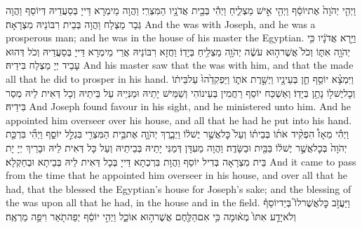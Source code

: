 {וַיְהִ֤י יְהֹוָה֙ אֶת\maqqaf יוֹסֵ֔ף וַיְהִ֖י אִ֣ישׁ מַצְלִ֑יחַ וַיְהִ֕י בְּבֵ֖ית אֲדֹנָ֥יו הַמִּצְרִֽי׃}
{וַהֲוָה מֵימְרָא דַּייָ בְּסַעֲדֵיהּ דְּיוֹסֵף וַהֲוָה גְּבַר מַצְלַח וַהֲוָה בְּבֵית רִבּוֹנֵיהּ מִצְרָאָה׃}
{And the \lord\space was with Joseph, and he was a prosperous man; and he was in the house of his master the Egyptian.}{}
{וַיַּ֣רְא אֲדֹנָ֔יו כִּ֥י יְהֹוָ֖ה אִתּ֑וֹ וְכֹל֙ אֲשֶׁר\maqqaf ה֣וּא עֹשֶׂ֔ה יְהֹוָ֖ה מַצְלִ֥יחַ בְּיָדֽוֹ׃}
{וַחֲזָא רִבּוֹנֵיהּ אֲרֵי מֵימְרָא דַּייָ בְּסַעֲדֵיהּ וְכֹל דְּהוּא עָבֵיד יְיָ מַצְלַח בִּידֵיהּ׃}
{And his master saw that the \lord\space was with him, and that the \lord\space made all that he did to prosper in his hand.}{}
{וַיִּמְצָ֨א יוֹסֵ֥ף חֵ֛ן בְּעֵינָ֖יו וַיְשָׁ֣רֶת אֹת֑וֹ וַיַּפְקִדֵ֙הוּ֙ עַל\maqqaf בֵּית֔וֹ וְכׇל\maqqaf יֶשׁ\maqqaf ל֖וֹ נָתַ֥ן בְּיָדֽוֹ׃}
{וְאַשְׁכַּח יוֹסֵף רַחֲמִין בְּעֵינוֹהִי וְשַׁמֵּישׁ יָתֵיהּ וּמַנְּיֵיהּ עַל בֵּיתֵיהּ וְכָל דְּאִית לֵיהּ מְסַר בִּידֵיהּ׃}
{And Joseph found favour in his sight, and he ministered unto him. And he appointed him overseer over his house, and all that he had he put into his hand.}{}
{וַיְהִ֡י מֵאָז֩ הִפְקִ֨יד אֹת֜וֹ בְּבֵית֗וֹ וְעַל֙ כׇּל\maqqaf אֲשֶׁ֣ר יֶשׁ\maqqaf ל֔וֹ וַיְבָ֧רֶךְ יְהֹוָ֛ה אֶת\maqqaf בֵּ֥ית הַמִּצְרִ֖י בִּגְלַ֣ל יוֹסֵ֑ף וַיְהִ֞י בִּרְכַּ֤ת יְהֹוָה֙ בְּכׇל\maqqaf אֲשֶׁ֣ר יֶשׁ\maqqaf ל֔וֹ בַּבַּ֖יִת וּבַשָּׂדֶֽה׃}
{וַהֲוָה מֵעִדָּן דְּמַנִּי יָתֵיהּ בְּבֵיתֵיהּ וְעַל כָּל דְּאִית לֵיהּ וּבָרֵיךְ יְיָ יָת בֵּית מִצְרָאָה בְּדִיל יוֹסֵף וַהֲוָת בִּרְכְתָא דַּייָ בְּכָל דְּאִית לֵיהּ בְּבֵיתָא וּבְחַקְלָא׃}
{And it came to pass from the time that he appointed him overseer in his house, and over all that he had, that the \lord\space blessed the Egyptian’s house for Joseph’s sake; and the blessing of the \lord\space was upon all that he had, in the house and in the field.}{}
{וַיַּעֲזֹ֣ב כׇּל\maqqaf אֲשֶׁר\maqqaf לוֹ֮ בְּיַד\maqqaf יוֹסֵף֒ וְלֹא\maqqaf יָדַ֤ע אִתּוֹ֙ מְא֔וּמָה כִּ֥י אִם\maqqaf הַלֶּ֖חֶם אֲשֶׁר\maqqaf ה֣וּא אוֹכֵ֑ל וַיְהִ֣י יוֹסֵ֔ף יְפֵה\maqqaf תֹ֖אַר וִיפֵ֥ה מַרְאֶֽה׃}
